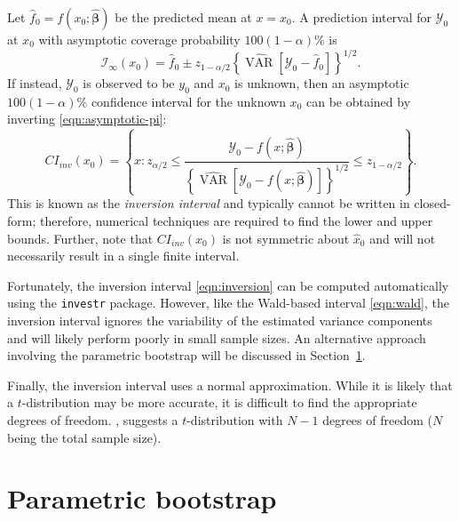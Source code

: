 \documentclass{article}\usepackage[]{graphicx}\usepackage[]{color}
\newcommand{\VAR}{\operatorname{VAR}}
\begin{document}
Let $\widehat{f}_0 = f\left(x_0; \widehat{\bm{\beta}}\right)$ be the predicted mean at $x = x_0$.  A prediction interval for $\mathcal{Y}_0$ at $x_0$ with asymptotic coverage probability $100(1-\alpha)\%$ is
\begin{equation}
\label{eqn:asymptotic-pi}
  \mathcal{I}_\infty\left(x_0\right) = \widehat{f}_0 \pm z_{1-\alpha/2}\left\{ \widehat{\VAR}\left[\mathcal{Y}_0 - \widehat{f}_0\right] \right\}^{1/2}.
\end{equation}
If instead, $\mathcal{Y}_0$ is observed to be $y_0$ and $x_0$ is unknown, then an asymptotic $100(1-\alpha)\%$ confidence interval for the unknown $x_0$ can be obtained by inverting \eqref{eqn:asymptotic-pi}:
\begin{equation}
\label{eqn:inversion}
  CI_{inv}\left(x_0\right) = \left\{ x: z_{\alpha/2} \le \frac{\mathcal{Y}_0-f\left(x; \widehat{\bm{\beta}}\right)}{\left\{ \widehat{\VAR}\left[\mathcal{Y}_0 - f\left(x; \widehat{\bm{\beta}}\right)\right] \right\}^{1/2}} \le z_{1-\alpha/2} \right\}.
\end{equation}
This is known as the \emph{inversion interval} and typically cannot be written in closed-form; therefore, numerical techniques are required to find the lower and upper bounds.  Further, note that $CI_{inv}\left(x_0\right)$ is not symmetric about $\widehat{x}_0$ and will not necessarily result in a single finite interval.

Fortunately, the inversion interval \eqref{eqn:inversion} can be computed automatically using the \texttt{investr} package.  However, like the Wald-based interval \eqref{eqn:wald}, the inversion interval ignores the variability of the estimated variance components and will likely perform poorly in small sample sizes.  An alternative approach involving the parametric bootstrap will be discussed in Section~\ref{sec:boot}.

Finally, the inversion interval uses a normal approximation.  While it is likely that a $t$-distribution may be more accurate, it is difficult to find the appropriate degrees of freedom. \citet{oman-calibration-1998}, suggests a $t$-distribution with $N-1$ degrees of freedom ($N$ being the total sample size).



\section{Parametric bootstrap}\label{sec:boot}
\end{document}
